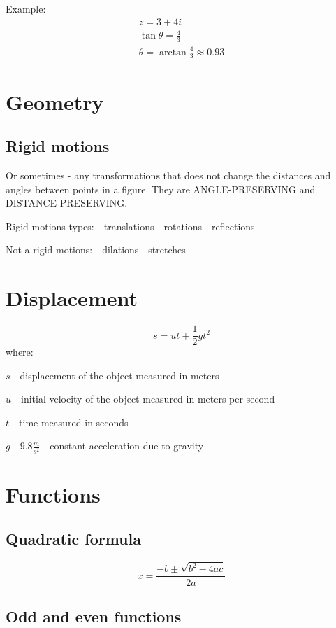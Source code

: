 \documentclass{article}
\begin{document}
Example:
\begin{equation}
  \begin{gathered}
  z = 3 + 4i \\
  \tan \theta = \frac{4}{3} \\
  \theta = \arctan\frac{4}{3} \approx 0.93
  \end{gathered}
\end{equation}

\section{Geometry}
\subsection{Rigid motions}
Or sometimes - any transformations that does not change the distances
and angles between points in a figure. They are ANGLE-PRESERVING and
DISTANCE-PRESERVING.

Rigid motions types:
- translations
- rotations
- reflections

Not a rigid motions:
- dilations
- stretches

\section{Displacement}
\begin{equation}
  s = ut+\frac{1}{2}gt^2
\end{equation}
where:

$s$ - displacement of the object measured in meters

$u$ - initial velocity of the object measured in meters per second

$t$ - time measured in seconds

$g$ - $9.8\frac{m}{s^2}$ - constant acceleration due to gravity
\section{Functions}
\subsection{Quadratic formula}
\begin{equation}
  x = \frac{-b \pm \sqrt{b^2 - 4ac}}{2a}
\end{equation}

\subsection{Odd and even functions}
\end{document}
